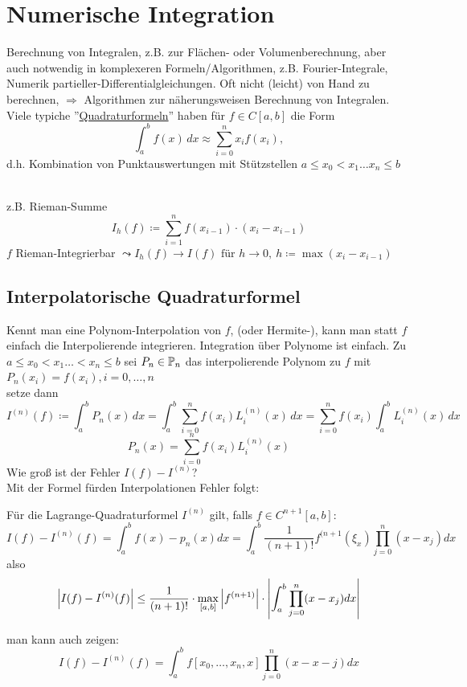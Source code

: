 \documentclass[../Skript.tex]{subfiles}
\begin{document}
\section{Numerische Integration}
Berechnung von Integralen, z.B. zur Flächen- oder Volumenberechnung, 
aber auch 
notwendig in komplexeren Formeln/Algorithmen, z.B. Fourier-Integrale, 
Numerik 
partieller-Differentialgleichungen. Oft nicht (leicht) von Hand zu 
berechnen, 
\(\Rightarrow\) Algorithmen zur näherungsweisen Berechnung von 
Integralen.\\
Viele typiche ''\underline{Quadraturformeln}'' haben für \(f\in C[a,b]\)
die Form 
\[
\int^b_a f(x)\, dx \approx \sum_{i=0}^n x_i f(x_i),
\]
 d.h. Kombination von Punktauswertungen mit Stützstellen \( a\leq x_0 < 
 x_1\dots 
 x_n\leq b\)
\begin{remindexample}\hfill\\
z.B. Rieman-Summe \[
I_h(f)\coloneqq \sum_{i=1}^n f(x_{i-1})\cdot(x_i-x_{i-1})
\]
\(f\) Rieman-Integrierbar \(\leadsto I_h(f)\to I(f) \text{ für } h\to 
0, \ 
h\coloneqq \max(x_i-x_{i-1})\)\\
\end{remindexample}
\subsection{Interpolatorische Quadraturformel}
Kennt man eine Polynom-Interpolation von $f$, (oder Hermite-), kann man 
statt $f$ 
einfach die Interpolierende integrieren. Integration über Polynome ist 
einfach.
Zu \(a\leq x_0 <x_1\dots < x_n\leq b\) sei \(P_n\in\mathbb{P}_n\) das 
interpolierende 
Polynom zu \(f\) mit \(P_n(x_i)=f(x_i), i=0,\dots, n\)\\
setze dann \[
I^{(n)}(f)\coloneqq \int^b_aP_n(x)\, dx =\int^b_a \sum_{i=0}^n 
f(x_i)L^{(n)}_i(x)\, dx = \sum_{i=0}^n f(x_i)\int^b_a L^{(n)}_i(x)\, dx
\]
\[
P_n(x)=\sum_{i=0}^n f(x_i)L^{(n)}_i(x)
\]
Wie groß ist der Fehler \(I(f)-I^{(n)}\)?\\
Mit der Formel fürden Interpolationen Fehler folgt:

\begin{theorem}
    Für die Lagrange-Quadraturformel $I^{(n)}$ gilt, falls $f \in
    C^{n+1}[a,b]$:\[
        I(f) - I^{(n)}(f) = \int_a^b f(x) - p_n(x) dx = \int_a^b\frac{1}
        {(n+1)!}
        f^{(n+1}(\xi_x)\prod_{j=0}^n(x-x_j)dx
    \]
    also \[   
        \left\vert I(f) - I^{(n)}(f) \right\vert \leq \frac{1}{(n+1)!}\cdot 
        \max\limits_{[a,b]}
        \left\vert f^{(n+1)} \right\vert\cdot \left\vert \int_a^b\prod_{j=0}^n(x-x_j) dx \right\vert
    \]
\end{theorem}
\begin{remark}
    man kann auch zeigen:\[
    I(f) - I^{(n)}(f) = \int_a^b f[x_0, \dots, x_n, x] \prod_{j=0}^n(x-
    x-j)dx
    \] 
\end{remark}
\end{document}
